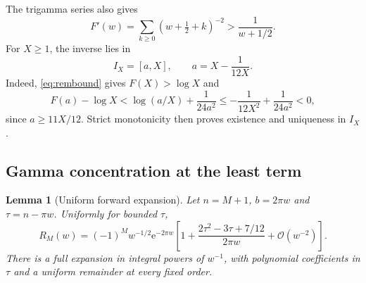 \documentclass[11pt,a4paper]{article}
\newtheorem{lemma}[theorem]{Lemma}
\theoremstyle{definition}
\numberwithin{equation}{section}
\newcommand{\e}{\mathrm e}
\newcommand{\Oh}{\mathcal O}
\begin{document}
The trigamma series also gives
\begin{equation}
 F'(w)=\sum_{k\ge0}(w+\tfrac12+k)^{-2}>\frac1{w+1/2}.
 \label{eq:slope}
\end{equation}
For $X\ge1$, the inverse lies in
\begin{equation}
 I_X=[a,X],\qquad a=X-\frac1{12X}.
 \label{eq:bracket}
\end{equation}
Indeed, \eqref{eq:rembound} gives $F(X)>\log X$ and
\[
 F(a)-\log X<\log(a/X)+\frac1{24a^2}
 \le-\frac1{12X^2}+\frac1{24a^2}<0,
\]
since $a\ge11X/12$. Strict monotonicity then proves existence and uniqueness in $I_X$.

\subsection{Gamma concentration at the least term}
\begin{lemma}[Uniform forward expansion]
\label{lem:gamma}
Let $n=M+1$, $b=2\pi w$ and $\tau=n-\pi w$. Uniformly for bounded $\tau$,
\begin{equation}
 R_M(w)=(-1)^Mw^{-1/2}\e^{-2\pi w}
 \left[1+\frac{2\tau^2-3\tau+7/12}{2\pi w}
 +\Oh(w^{-2})\right].
 \label{eq:gammafirst}
\end{equation}
There is a full expansion in integral powers of $w^{-1}$, with polynomial coefficients in $\tau$ and a uniform remainder at every fixed order.
\end{lemma}
\end{document}
